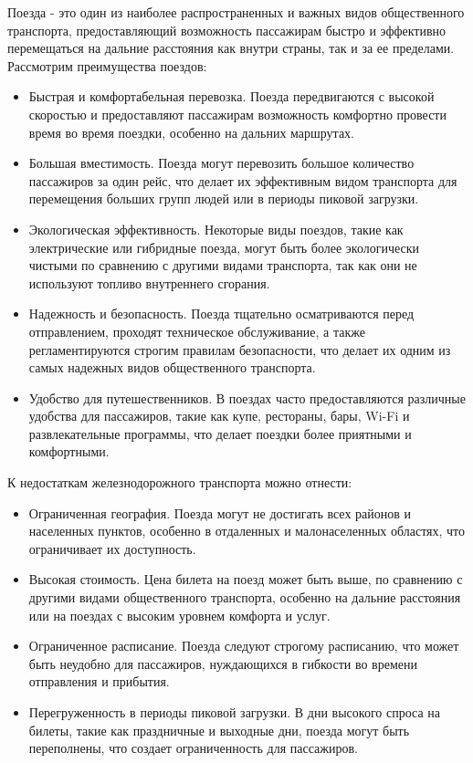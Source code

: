 Поезда - это один из наиболее распространенных и важных видов общественного транспорта, предоставляющий возможность пассажирам быстро и эффективно перемещаться на дальние расстояния как внутри страны, так и за ее пределами. Рассмотрим преимущества поездов:
\begin{itemize}
	\item Быстрая и комфортабельная перевозка. Поезда передвигаются с высокой скоростью и предоставляют пассажирам возможность комфортно провести время во время поездки, особенно на дальних маршрутах.
	\item Большая вместимость. Поезда могут перевозить большое количество пассажиров за один рейс, что делает их эффективным видом транспорта для перемещения больших групп людей или в периоды пиковой загрузки.
	\item Экологическая эффективность. Некоторые виды поездов, такие как электрические или гибридные поезда, могут быть более экологически чистыми по сравнению с другими видами транспорта, так как они не используют топливо внутреннего сгорания.
	\item Надежность и безопасность. Поезда тщательно осматриваются перед отправлением, проходят техническое обслуживание, а также регламентируются строгим правилам безопасности, что делает их одним из самых надежных видов общественного транспорта.
	\item Удобство для путешественников. В поездах часто предоставляются различные удобства для пассажиров, такие как купе, рестораны, бары, Wi-Fi и развлекательные программы, что делает поездки более приятными и комфортными.
\end{itemize}

К недостаткам железнодорожного транспорта можно отнести:
\begin{itemize}
	\item Ограниченная география. Поезда могут не достигать всех районов и населенных пунктов, особенно в отдаленных и малонаселенных областях, что ограничивает их доступность.
	\item Высокая стоимость. Цена билета на поезд может быть выше, по сравнению с другими видами общественного транспорта, особенно на дальние расстояния или на поездах с высоким уровнем комфорта и услуг.
	\item Ограниченное расписание. Поезда следуют строгому расписанию, что может быть неудобно для пассажиров, нуждающихся в гибкости во времени отправления и прибытия.
	\item Перегруженность в периоды пиковой загрузки. В дни высокого спроса на билеты, такие как праздничные и выходные дни, поезда могут быть переполнены, что создает ограниченность для пассажиров.
\end{itemize}

